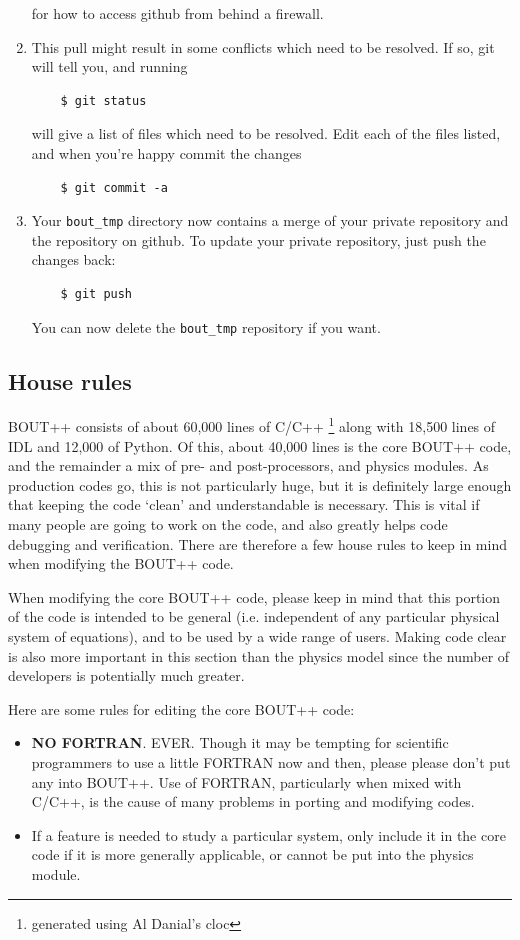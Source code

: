 \documentclass[12pt]{article}
\begin{document}
\begin{enumerate}
  for how to access github from behind a firewall.
\item
  This pull might result in some conflicts which need to be resolved. If so, git will
  tell you, and running
  \begin{verbatim}
    $ git status
  \end{verbatim}
  will give a list of files which need to be resolved. Edit each of the files listed, and when you're happy 
  commit the changes
  \begin{verbatim}
    $ git commit -a
  \end{verbatim}
\item Your \texttt{bout\_tmp} directory now contains a merge of your private repository and the repository
  on github. To update your private repository, just push the changes back:
  \begin{verbatim}
    $ git push
  \end{verbatim}
  You can now delete the \texttt{bout\_tmp} repository if you want.
\end{enumerate}


\subsection{House rules}

BOUT++ consists of about 60,000 lines of C/C++
%
\footnote{generated using Al Danial's cloc}
along with 18,500 lines of IDL and 12,000 of Python. Of this, about
40,000 lines is the core BOUT++ code, and the remainder a mix of pre-
and post-processors, and physics modules. As production codes go, this
is not particularly huge, but it is definitely large enough that
keeping the code `clean' and understandable is necessary. This is
vital if many people are going to work on the code, and also greatly
helps code debugging and verification. There are therefore a few house
rules to keep in mind when modifying the BOUT++ code.

When modifying the core BOUT++ code, please keep in mind that this portion of the code
is intended to be general (i.e. independent of any particular physical system of equations),
and to be used by a wide range of users. Making code clear is also more important
in this section than the physics model since the number of developers is potentially
much greater. 

Here are some rules for editing the core BOUT++ code:
\begin{itemize}
\item {} {\bf NO FORTRAN}. EVER. Though it may be tempting for scientific programmers to use
a little FORTRAN now and then, please please don't put any into BOUT++. 
Use of FORTRAN, particularly when mixed with C/C++, is the cause of many problems in
porting and modifying codes. 
\item If a feature is needed to study a particular system, only include it in the
core code if it is more generally applicable, or cannot be put into the physics module.
\end{itemize}
\end{document}
